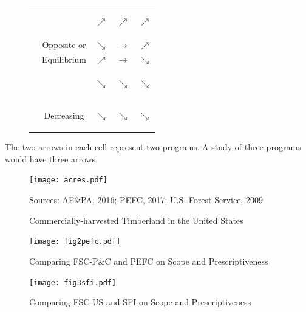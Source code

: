 \documentclass{article}
\begin{document}
\begin{figure}[h!]
\begin{tabular}{cllll}
\multicolumn{1}{c}{} & \multicolumn{1}{l|}{}   & \multicolumn{1}{c|}{$\nearrow$}           & \multicolumn{1}{c|}{$\nearrow$}       & \multicolumn{1}{c|}{\begin{rotate}{-30}$\nearrow$\end{rotate}}          \\
\cline{3-5} 
\multicolumn{1}{c}{} & \multicolumn{1}{c|}{Opposite or }   & \multicolumn{1}{c|}{$\searrow$}           & \multicolumn{1}{c|}{$\longrightarrow$}       & \multicolumn{1}{c|}{$\nearrow$}          \\  
\multicolumn{1}{c}{} & \multicolumn{1}{c|}{Equilibrium}   & \multicolumn{1}{c|}{$\nearrow$}           & \multicolumn{1}{c|}{$\longrightarrow$}       & \multicolumn{1}{c|}{$\searrow$}          \\ \cline{3-5} 
\multicolumn{1}{c}{} & \multicolumn{1}{c|}{} & \multicolumn{1}{c|}{$\searrow$}           & \multicolumn{1}{c|}{$\searrow$}       & \multicolumn{1}{c|}{\begin{rotate}{30}$\searrow$\end{rotate}}          \\ 
\multicolumn{1}{c}{} & \multicolumn{1}{c|}{Decreasing} & \multicolumn{1}{c|}{\begin{rotate}{30}$\searrow$\end{rotate}}           & \multicolumn{1}{c|}{$\searrow$}       & \multicolumn{1}{c|}{$\searrow$}          \\ \cline{3-5} 
\end{tabular}
\end{figure}
\footnotesize *The two arrows in each cell represent two programs. A study of three programs would have three arrows. 





\begin{figure}[h!]
\centering
\caption{Commercially-harvested Timberland in the United States}
\label{acres}
\centering
\texttt{[image: acres.pdf]}
\centering
\footnotesize

Sources: AF\&PA, 2016; PEFC, 2017; U.S. Forest Service, 2009

\end{figure}

\newpage


\begin{figure}[h!]
\centering
\label{pefc}
\caption{Comparing FSC-P\&C and PEFC on Scope and Prescriptiveness}
\texttt{[image: fig2pefc.pdf]}
\end{figure}

\newpage

\begin{figure}[h!]
\centering
\label{sfi}
\caption{Comparing FSC-US and SFI on Scope and Prescriptiveness}
\texttt{[image: fig3sfi.pdf]}
\end{figure}
\end{document}
